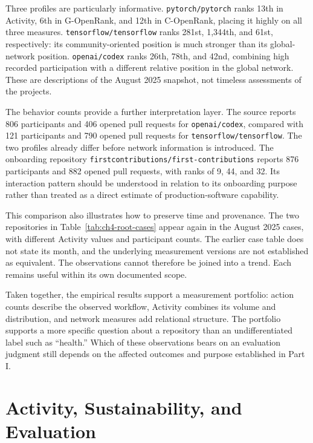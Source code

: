 Three profiles are particularly informative. \texttt{pytorch/pytorch} ranks 13th in Activity, 6th in G-OpenRank, and 12th in C-OpenRank, placing it highly on all three measures. \texttt{tensorflow/tensorflow} ranks 281st, 1,344th, and 61st, respectively: its community-oriented position is much stronger than its global-network position. \texttt{openai/codex} ranks 26th, 78th, and 42nd, combining high recorded participation with a different relative position in the global network. These are descriptions of the August 2025 snapshot, not timeless assessments of the projects.

The behavior counts provide a further interpretation layer. The source reports 806 participants and 406 opened pull requests for \texttt{openai/codex}, compared with 121 participants and 790 opened pull requests for \texttt{tensorflow/tensorflow}. The two profiles already differ before network information is introduced. The onboarding repository \texttt{firstcontributions/}\allowbreak\texttt{first-contributions} reports 876 participants and 882 opened pull requests, with ranks of 9, 44, and 32. Its interaction pattern should be understood in relation to its onboarding purpose rather than treated as a direct estimate of production-software capability.

This comparison also illustrates how to preserve time and provenance. The two repositories in Table~\ref{tab:ch4-root-cases} appear again in the August 2025 cases, with different Activity values and participant counts. The earlier case table does not state its month, and the underlying measurement versions are not established as equivalent. The observations cannot therefore be joined into a trend. Each remains useful within its own documented scope.

Taken together, the empirical results support a measurement portfolio: action counts describe the observed workflow, Activity combines its volume and distribution, and network measures add relational structure. The portfolio supports a more specific question about a repository than an undifferentiated label such as ``health.'' Which of these observations bears on an evaluation judgment still depends on the affected outcomes and purpose established in Part I.

\section{Activity, Sustainability, and Evaluation}
\label{sec:ch4-sustainability}


